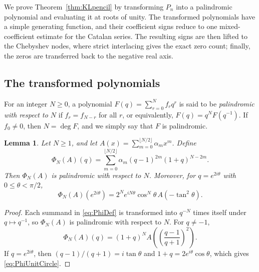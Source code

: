 \documentclass[11pt]{article}
\theoremstyle{plain}
\newtheorem{lemma}[theorem]{Lemma}
\theoremstyle{remark}
\begin{document}
We prove Theorem~\ref{thm:KLpencil} by transforming $P_n$ into a
palindromic polynomial and evaluating it at roots of unity.  The
transformed polynomials have a simple generating function, and their
coefficient signs reduce to one mixed-coefficient estimate for the
Catalan series.  The resulting signs are then lifted to the Chebyshev
nodes, where strict interlacing gives the exact zero count; finally,
the zeros are transferred back to the negative real axis.

\subsection{The transformed polynomials}

For an integer $N\ge0$, a polynomial
$F(q)=\sum_{r=0}^{N}f_rq^r$ is said to be \emph{palindromic with
respect to $N$} if $f_r=f_{N-r}$ for all $r$, or equivalently,
$F(q)=q^NF(q^{-1})$.  If $f_0\ne0$, then $N=\deg F$, and we simply
say that $F$ is palindromic.

\begin{lemma}\label{lem:PhiBasic}
Let $N\ge1$, and let
$A(x)=\sum_{m=0}^{\lfloor N/2\rfloor}\alpha_mx^m$.  Define
\begin{equation}\label{eq:PhiDef}
\Phi_N(A)(q)=\sum_{m=0}^{\lfloor N/2\rfloor}
\alpha_m(q-1)^{2m}(1+q)^{N-2m}.
\end{equation}
Then $\Phi_N(A)$ is palindromic with respect to $N$.  Moreover, for
$q=e^{2i\theta}$ with $0\le\theta<\pi/2$,
\begin{equation}\label{eq:PhiUnitCircle}
\Phi_N(A)(e^{2i\theta})
=2^Ne^{iN\theta}\cos^N\theta\,A(-\tan^2\theta).
\end{equation}
\end{lemma}

\begin{proof}
Each summand in \eqref{eq:PhiDef} is transformed into $q^{-N}$ times
itself under $q\mapsto q^{-1}$, so $\Phi_N(A)$ is palindromic with
respect to $N$.  For $q\ne-1$,
\begin{equation}\label{eq:PhiRational}
\Phi_N(A)(q)=(1+q)^N
A\!\left(\left(\frac{q-1}{q+1}\right)^2\right).
\end{equation}
If $q=e^{2i\theta}$, then $(q-1)/(q+1)=i\tan\theta$ and
$1+q=2e^{i\theta}\cos\theta$, which gives
\eqref{eq:PhiUnitCircle}.
\end{proof}
\end{document}
